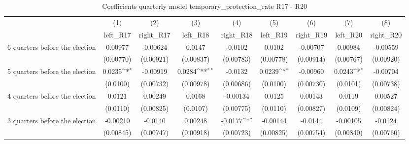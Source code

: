 \begin{table}[htbp]\centering
\def\sym#1{\ifmmode^{#1}\else\(^{#1}\)\fi}
\caption{Coefficients quarterly model temporary\_protection\_rate R17 - R20}
\begin{tabular}{l*{8}{c}}
\hline\hline
                    &\multicolumn{1}{c}{(1)}&\multicolumn{1}{c}{(2)}&\multicolumn{1}{c}{(3)}&\multicolumn{1}{c}{(4)}&\multicolumn{1}{c}{(5)}&\multicolumn{1}{c}{(6)}&\multicolumn{1}{c}{(7)}&\multicolumn{1}{c}{(8)}\\
                    &\multicolumn{1}{c}{left\_R17}&\multicolumn{1}{c}{right\_R17}&\multicolumn{1}{c}{left\_R18}&\multicolumn{1}{c}{right\_R18}&\multicolumn{1}{c}{left\_R19}&\multicolumn{1}{c}{right\_R19}&\multicolumn{1}{c}{left\_R20}&\multicolumn{1}{c}{right\_R20}\\
\hline
 6 quarters before the election&     0.00977         &    -0.00624         &      0.0147         &     -0.0102         &      0.0102         &    -0.00707         &     0.00984         &    -0.00559         \\
                    &   (0.00770)         &   (0.00921)         &   (0.00837)         &   (0.00783)         &   (0.00778)         &   (0.00914)         &   (0.00767)         &   (0.00920)         \\
[1em]
 5 quarters before the election&      0.0235\sym{*}  &    -0.00919         &      0.0284\sym{**} &     -0.0132         &      0.0239\sym{*}  &    -0.00960         &      0.0243\sym{*}  &    -0.00704         \\
                    &    (0.0100)         &   (0.00732)         &   (0.00978)         &   (0.00686)         &    (0.0100)         &   (0.00730)         &    (0.0101)         &   (0.00738)         \\
[1em]
 4 quarters before the election&      0.0121         &     0.00249         &      0.0168         &    -0.00134         &      0.0125         &     0.00143         &      0.0119         &     0.00527         \\
                    &    (0.0110)         &   (0.00825)         &    (0.0107)         &   (0.00775)         &    (0.0110)         &   (0.00827)         &    (0.0109)         &   (0.00824)         \\
[1em]
 3 quarters before the election&    -0.00210         &     -0.0140         &     0.00248         &     -0.0177\sym{*}  &    -0.00144         &     -0.0144         &    -0.00105         &     -0.0124         \\
                    &   (0.00845)         &   (0.00747)         &   (0.00918)         &   (0.00723)         &   (0.00825)         &   (0.00754)         &   (0.00840)         &   (0.00760)         \\

\end{tabular}
\end{table}
